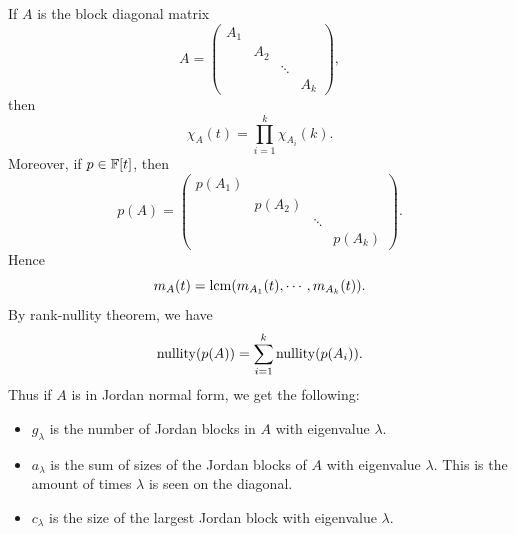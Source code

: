 \documentclass[a4paper,11pt]{article}
\begin{document}
If $A$ is the block diagonal matrix
\[
  A =
  \begin{pmatrix}
    A_1\\
    & A_2\\
    & & \ddots\\
    & & & A_k
  \end{pmatrix},
\]
then
\[
  \chi_A(t) = \prod_{i = 1}^k \chi_{A_i}(k).
\]
Moreover, if $p \in {\mathbb{F}}[t]$, then
\[
  p (A) =
  \begin{pmatrix}
    p(A_1)\\
    & p(A_2)\\
    & & \ddots\\
    & & & p(A_k)
  \end{pmatrix}.
\]
Hence
\[
  m_A(t) = \operatorname{lcm} (m_{A_1}(t), \cdots, m_{A_k} (t)).
\]
By rank-nullity theorem, we have
\[
  \operatorname{nullity}(p(A)) = \sum_{i = 1}^k \operatorname{nullity}(p(A_i)).
\]
Thus if $A$ is in Jordan normal form, we get the following:
\begin{itemize}
  \item $g_\lambda$ is the number of Jordan blocks in $A$ with eigenvalue $\lambda$.
  \item $a_\lambda$ is the sum of sizes of the Jordan blocks of $A$ with eigenvalue $\lambda$. This is the amount of times \( \lambda \) is seen on the diagonal.
  \item $c_\lambda$ is the size of the largest Jordan block with eigenvalue $\lambda$.
\end{itemize}
\end{document}
